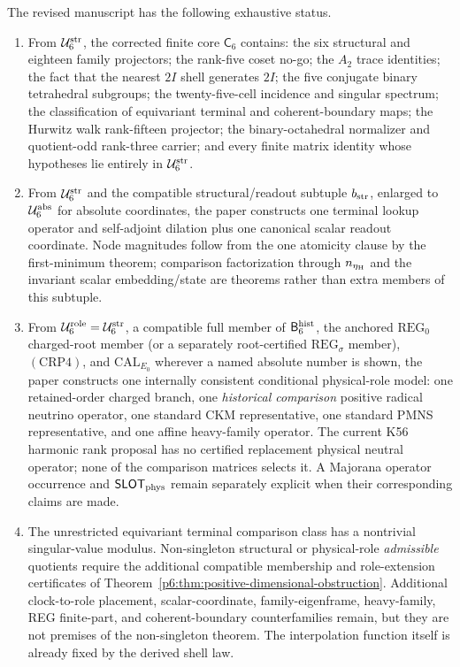 \documentclass[12pt,a4paper]{article}
\newcommand{\CoreSix}{\mathsf C_6}
\newcommand{\BridgeRaw}{\mathsf B_6^{\rm hist}}
\newcommand{\Ubase}{\mathcal U_6^{\rm str}}
\newcommand{\Urole}{\mathcal U_6^{\rm role}}
\newcommand{\Uabs}{\mathcal U_6^{\rm abs}}
\newcommand{\etaH}{\eta_{\rm H}}
\begin{document}
\begin{theorem}
\label{p6:thm:full-reconstruction}
The revised manuscript has the following exhaustive status.
\begin{enumerate}[label=(\roman*),leftmargin=2em]
\item From \(\Ubase\), the corrected finite core \(\CoreSix\) contains:
the six structural and eighteen family projectors; the rank-five coset
no-go; the \(A_2\) trace identities; the fact that the nearest \(2I\) shell
generates \(2I\); the five conjugate binary tetrahedral subgroups; the
twenty-five-cell incidence and singular spectrum; the classification of
equivariant terminal and coherent-boundary maps; the Hurwitz walk
rank-fifteen projector; the binary-octahedral normalizer and quotient-odd
rank-three carrier; and every finite matrix identity whose hypotheses lie
entirely in \(\Ubase\).

\item From \(\Ubase\) and the compatible structural/readout subtuple
\(b_{\rm str}\), enlarged to \(\Uabs\) for absolute coordinates, the paper
constructs one terminal lookup operator and self-adjoint dilation plus one
canonical scalar readout coordinate.  Node magnitudes follow from the one
atomicity clause by the first-minimum theorem; comparison factorization through
\(n_{\etaH}\) and the invariant scalar embedding/state are theorems rather than
extra members of this subtuple.

\item From \(\Urole=\Ubase\), a compatible full member of
\(\BridgeRaw\), the anchored \(\mathrm{REG}_0\) charged-root
member (or a separately root-certified \(\mathrm{REG}_\sigma\) member),
\((\mathrm{CRP4})\), and \(\mathrm{CAL}_{E_0}\) wherever a named absolute
number is shown, the paper constructs one internally consistent conditional
physical-role model: one retained-order charged branch, one \emph{historical comparison}
positive radical neutrino operator, one standard CKM representative, one
standard PMNS representative, and one affine heavy-family operator.
The current K56 harmonic rank proposal has no certified replacement
physical neutral operator; none of the comparison matrices selects it.  A Majorana operator
occurrence and \(\mathsf{SLOT}_{\rm phys}\) remain separately explicit when
their corresponding claims are made.

\item The unrestricted equivariant terminal comparison class has a
nontrivial singular-value modulus. Non-singleton structural or physical-role
\emph{admissible} quotients require the additional compatible membership
and role-extension certificates of
Theorem~\ref{p6:thm:positive-dimensional-obstruction}. Additional
clock-to-role placement, scalar-coordinate, family-eigenframe, heavy-family,
REG finite-part, and coherent-boundary counterfamilies remain, but they are not
premises of the non-singleton theorem.  The interpolation function itself is
already fixed by the derived shell law.


\end{enumerate}
\end{theorem}
\end{document}
